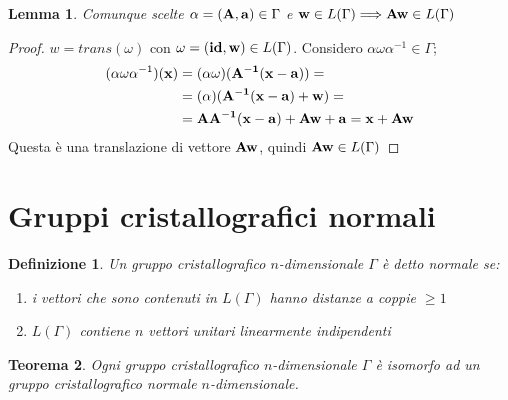 \documentclass[a4paper]{book}
\newtheorem{definition}{Definizione}[section]
\newtheorem{theorem}{Teorema}[section]
\newtheorem{lemma}[theorem]{Lemma}
\begin{document}
\begin{lemma}
\label{lemma:aw}
Comunque scelte $\alpha = (\vb{A, a}) \in \Gamma$ e $\vb{w} \in L(\Gamma) \Longrightarrow \vb{Aw} \in L(\Gamma)$ 
\end{lemma}

\begin{proof}
$w = trans(\omega)$ con $\omega = (\vb{id, w}	) \in L(\Gamma)$. 
Considero $\alpha \omega \alpha^{-1} \in \Gamma$; 
\[ \begin{split}
( \alpha \omega \alpha^{-1} )(\vb{x}) & = ( \alpha \omega)(\vb{A^{-1}(x-a)}) = \\
& =  ( \alpha  )(\vb{A^{-1}(x-a)} + \vb{w}) = \\
& = \vb{AA^{-1}(x-a)} + \vb{Aw} + \vb{a} = \vb{x} + \vb{Aw} 
\end{split}\] 
Questa è una translazione di vettore $\vb{Aw}$, quindi $\vb{Aw} \in L(\Gamma)$
\end{proof}


\section{Gruppi cristallografici normali}

\begin{definition}
Un gruppo cristallografico $n$-dimensionale $\Gamma$ è detto normale se:
\begin{enumerate}
\item i vettori che sono contenuti in $L(\Gamma)$ hanno distanze a coppie $\geq 1$
\item $L(\Gamma)$ contiene $n$ vettori unitari linearmente indipendenti
\end{enumerate}
\end{definition}


\begin{theorem}
Ogni gruppo cristallografico $n$-dimensionale $\Gamma$ è isomorfo ad un gruppo cristallografico normale $n$-dimensionale.
\end{theorem}
\end{document}
